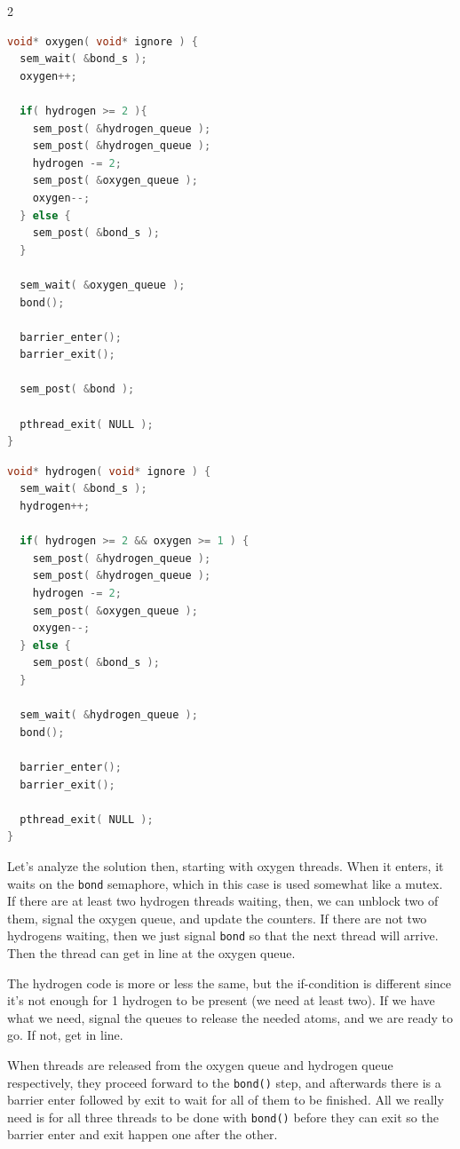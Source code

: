\begin{multicols}{2}
	\begin{lstlisting}[language=C]
void* oxygen( void* ignore ) {
  sem_wait( &bond_s );
  oxygen++;
  
  if( hydrogen >= 2 ){
    sem_post( &hydrogen_queue );
    sem_post( &hydrogen_queue );
    hydrogen -= 2;
    sem_post( &oxygen_queue );
    oxygen--;
  } else {
    sem_post( &bond_s );
  }
  
  sem_wait( &oxygen_queue );
  bond();

  barrier_enter();
  barrier_exit();

  sem_post( &bond );
  
  pthread_exit( NULL );
}
\end{lstlisting}
	\columnbreak
	\begin{lstlisting}[language=C]
void* hydrogen( void* ignore ) {
  sem_wait( &bond_s );
  hydrogen++;
  
  if( hydrogen >= 2 && oxygen >= 1 ) {
    sem_post( &hydrogen_queue );
    sem_post( &hydrogen_queue );
    hydrogen -= 2;
    sem_post( &oxygen_queue );
    oxygen--;
  } else {
    sem_post( &bond_s );
  }
  
  sem_wait( &hydrogen_queue );
  bond();
  
  barrier_enter();
  barrier_exit();
  
  pthread_exit( NULL );
}
\end{lstlisting}
\end{multicols}


Let's analyze the solution then, starting with oxygen threads. When it enters, it waits on the \texttt{bond} semaphore, which in this case is used somewhat like a mutex. If there are at least two hydrogen threads waiting, then, we can unblock two of them, signal the oxygen queue, and update the counters. If there are not two hydrogens waiting, then we just signal \texttt{bond} so that the next thread will arrive. Then the thread can get in line at the oxygen queue.

The hydrogen code is more or less the same, but the if-condition is different since it's not enough for 1 hydrogen to be present (we need at least two). If we have what we need, signal the queues to release the needed atoms, and we are ready to go. If not, get in line.

When threads are released from the oxygen queue and hydrogen queue respectively, they proceed forward to the \texttt{bond()} step, and afterwards there is a barrier enter followed by exit to wait for all of them to be finished. All we really need is for all three threads to be done with \texttt{bond()} before they can exit so the barrier enter and exit happen one after the other.

